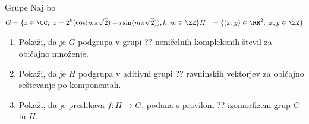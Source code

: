 \begin{frame}{Grupe}
	Naj bo
	\begin{align*}
		G &= \{z\in\CC; ~z=2^k(\cos(m\pi\sqrt{2})+i\sin(m\pi\sqrt{2})),k,m\in\ZZ\}
		H &= \{(x,y)\in\RR^2; ~x,y\in\ZZ\}
	\end{align*}
	\begin{enumerate}
		\item
			Pokaži, da je $G$ podgrupa v grupi ??
			neničelnih kompleksnih števil za običajno množenje.
		\item
			Pokaži, da je $H$ podgrupa v aditivni grupi ??
			ravninskih vektorjev za običajno seštevanje po komponentah.
		\item
			Pokaži, da je preslikava $f:H\to G$, podana s pravilom
			??
			izomorfizem grup $G$ in $H$.
	\end{enumerate}
\end{frame}
